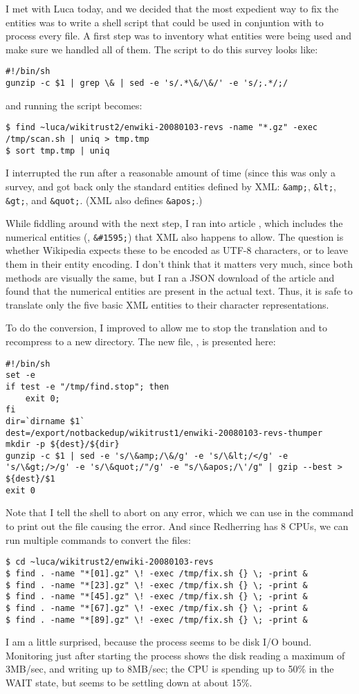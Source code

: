 I met with Luca today, and we decided that the most expedient
way to fix the entities was to write a shell script that could
be used in conjuntion with  to process every file.
A first step was to inventory what entities were being used and
make sure we handled all of them.
The script to do this survey looks like:
\begin{verbatim}
#!/bin/sh
gunzip -c $1 | grep \& | sed -e 's/.*\&/\&/' -e 's/;.*/;/
\end{verbatim}
and running the script becomes:
\begin{verbatim}
$ find ~luca/wikitrust2/enwiki-20080103-revs -name "*.gz" -exec /tmp/scan.sh | uniq > tmp.tmp
$ sort tmp.tmp | uniq
\end{verbatim}
I interrupted the run after a reasonable amount of time (since this
was only a survey, and got back only the standard entities defined by
XML: \texttt{\&amp;}, \texttt{\&lt;}, \texttt{\&gt;}, and \texttt{\&quot;}.
(XML also defines \texttt{\&apos;}.)

While fiddling around with the next step, I ran into
article , which includes the numerical
entities (\eg, \texttt{\&\#1595;}) that XML also happens to allow.
The question is whether Wikipedia expects these to be
encoded as UTF-8 characters, or to leave them in their
entity encoding.
I don't think that it matters very much, since both methods
are visually the same, but I ran a JSON download of the
 article and found that the numerical entities
are present in the actual text.
Thus, it is safe to translate only the five basic XML entities
to their character representations.

To do the conversion, I improved  to allow
me to stop the translation and to recompress to a new directory.
The new file, , is presented here:
\begin{verbatim}
#!/bin/sh
set -e
if test -e "/tmp/find.stop"; then
    exit 0;
fi
dir=`dirname $1`
dest=/export/notbackedup/wikitrust1/enwiki-20080103-revs-thumper
mkdir -p ${dest}/${dir}
gunzip -c $1 | sed -e 's/\&amp;/\&/g' -e 's/\&lt;/</g' -e 's/\&gt;/>/g' -e 's/\&quot;/"/g' -e "s/\&apos;/\'/g" | gzip --best > ${dest}/$1
exit 0
\end{verbatim}
Note that I tell the shell to abort on any error, which we
can use in the  command to print out the file
causing the error.
And since Redherring has 8 CPUs, we can run multiple 
commands to convert the files:
\begin{verbatim}
$ cd ~luca/wikitrust2/enwiki-20080103-revs
$ find . -name "*[01].gz" \! -exec /tmp/fix.sh {} \; -print &
$ find . -name "*[23].gz" \! -exec /tmp/fix.sh {} \; -print &
$ find . -name "*[45].gz" \! -exec /tmp/fix.sh {} \; -print &
$ find . -name "*[67].gz" \! -exec /tmp/fix.sh {} \; -print &
$ find . -name "*[89].gz" \! -exec /tmp/fix.sh {} \; -print &
\end{verbatim}

I am a little surprised, because the process seems to be
disk I/O bound.
Monitoring just after starting the process shows the
disk reading a maximum of 3MB/sec, and writing up to 8MB/sec;
the CPU is spending up to 50\% in the WAIT state, but seems to be
settling down at about 15\%.

